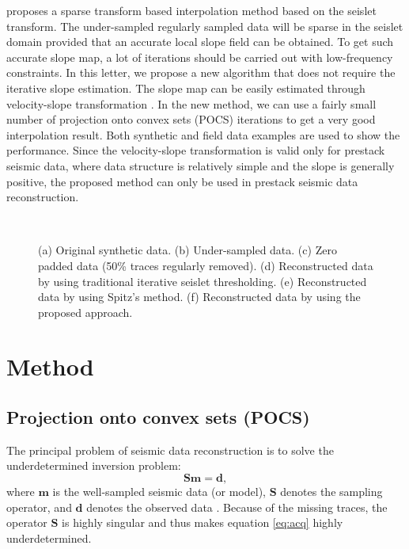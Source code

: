 \cite{shuwei20153} proposes a sparse transform based interpolation method based on the seislet transform. The under-sampled regularly sampled data will be sparse in the seislet domain provided that an accurate local slope field can be obtained. To get such accurate slope map, a lot of iterations should be carried out with low-frequency constraints. In this letter, we propose a new algorithm that does not require the iterative slope estimation. The slope map can be easily estimated through velocity-slope transformation \cite{liuyang2013}. In the new method, we can use a fairly small number of projection onto convex sets (POCS) iterations to get a very good interpolation result. Both synthetic and field data examples are used to show the performance. Since the velocity-slope transformation is valid only for prestack seismic data, where data structure is relatively simple and the slope is generally positive, the proposed method can only be used in prestack seismic data reconstruction. 

\begin{figure}[htb!]
  \centering
  \\
	\caption{(a) Original synthetic data. (b) Under-sampled data. (c) Zero padded data (50\% traces regularly removed). (d) Reconstructed data by using traditional iterative seislet thresholding. (e) Reconstructed data by using Spitz's method. (f) Reconstructed data by using the proposed approach.}
   \label{fig:hyper,hyper0,hyper-zero,hyper-seis,hyper-fx,hyper-seisvd}
\end{figure}

\section{Method}
\subsection{Projection onto convex sets (POCS)}
The principal problem of seismic data reconstruction is to solve the underdetermined inversion problem:
\begin{equation}
\label{eq:acq}
\mathbf{Sm}=\mathbf{d},
\end{equation}
where $\mathbf{m}$ is the well-sampled seismic data (or model), $\mathbf{S}$ denotes the sampling operator, and $\mathbf{d}$ denotes the observed data \cite{yangkang2014halfthr}. Because of the missing traces, the operator $\mathbf{S}$ is highly singular and thus makes equation \ref{eq:acq} highly underdetermined.

